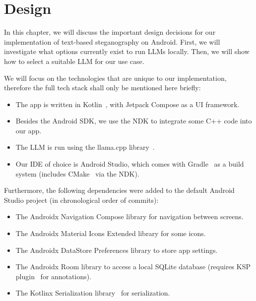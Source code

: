 
\chapter{Design}\label{ch:design}
\glsresetall %

In this chapter, we will discuss the important design decisions for our implementation of text-based steganography on Android. First, we will investigate what options currently exist to run \glspl{LLM} locally. Then, we will show how to select a suitable \gls{LLM} for our use case.

We will focus on the technologies that are unique to our implementation, therefore the full tech stack shall only be mentioned here briefly:
\begin{itemize}
	\item The app is written in Kotlin~\cite{kotlinKotlinProgrammingLanguage}, with Jetpack Compose as a \gls{UI} framework.
	\item Besides the Android \gls{SDK}, we use the \gls{NDK} to integrate some C++ code into our app.
	\item The \gls{LLM} is run using the llama.cpp library~\cite{gerganovGgerganovLlamacpp2024}.
	\item Our \gls{IDE} of choice is Android Studio, which comes with Gradle~\cite{gradleGradleBuildTool2025} as a build system (includes CMake~\cite{cmakeCMakeUpgradeYour} via the \gls{NDK}).
\end{itemize}

Furthermore, the following dependencies were added to the default Android Studio project (in chronological order of commits):
\begin{itemize}
	\item The Androidx Navigation Compose library for navigation between screens.
	\item The Androidx Material Icons Extended library for some icons.
	\item The Androidx DataStore Preferences library to store app settings.
	\item The Androidx Room library to access a local SQLite database (requires \gls{KSP} plugin~\cite{googleGoogleKsp2025} for annotations).
	\item The Kotlinx Serialization library~\cite{kotlinKotlinKotlinxserialization2025} for serialization.
\end{itemize}

